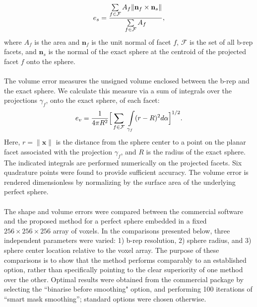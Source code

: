 \begin{equation} 
	e_s = \frac{ \sum \limits_{f\in\mathcal{F}} A_f \lVert {\bf n}_f \times {\bf n}_s \rVert}{\sum \limits_{f\in\mathcal{F}} A_f},
\end{equation}
where $A_f$ is the area and ${\bm n}_f$ is the unit normal of facet $f$, $\mathcal{F}$ is the set of all b-rep facets, and ${\bm n}_s$ is the normal of the exact sphere at the centroid of the projected facet $f$ onto the sphere. \\ \\
%
The volume error measures the unsigned volume enclosed between the b-rep and the exact sphere. We calculate this measure via a sum of integrals over the projections $\gamma_f$, onto the exact sphere, of each facet: 
\begin{equation}
\label{vol err}
	e_v = \frac{1}{4\pi R^2} \Big[\sum \limits_{f \in \mathcal{F}\textsl{}} \ \int \limits_{\gamma_f} (r - R)^2 d\alpha \Big]^{1/2} .
\end{equation}
Here, $r = \lVert {\bm x} \rVert$ is the distance from the sphere center to a point on the planar facet associated with the projection $\gamma_f$, and $R$ is the radius of the exact sphere.  The indicated integrals are performed numerically on the projected facets. Six quadrature points were found to provide sufficient accuracy. The volume error is rendered dimensionless by normalizing by the surface area of the underlying perfect sphere.
\\ \\
%
The shape and volume errors were compared between the commercial software and the proposed method for a perfect sphere embedded in a fixed $256 \times 256 \times 256$ array of voxels.  In the comparisons presented below, three independent parameters were varied:  1) b-rep resolution, 2) sphere radius, and 3) sphere center location relative to the voxel array. The purpose of these comparisons is to show that the method performs comparably to an established option, rather than specifically pointing to the clear superiority of one method over the other. Optimal results were obtained from the commercial package by selecting the ``binarise before smoothing" option, and performing 100 iterations of ``smart mask smoothing''; standard options were chosen otherwise. \\ \\
%

